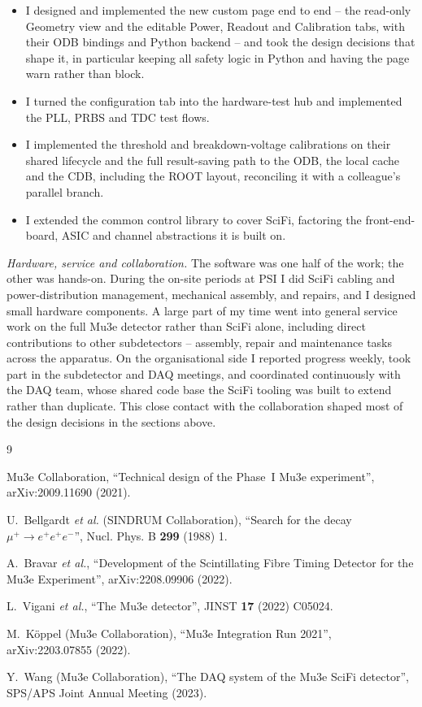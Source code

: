 \documentclass[12pt,a4paper]{article}
\newcommand{\pill}[1]{\textit{#1}\;}   %
\begin{document}
\begin{itemize}
	\item I designed and implemented the new custom page end to end -- the
	read-only Geometry view and the editable Power, Readout and Calibration tabs,
	with their ODB bindings and Python backend -- and took the design decisions
	that shape it, in particular keeping all safety logic in Python and having the
	page warn rather than block.
	\item I turned the configuration tab into the hardware-test hub and
	implemented the PLL, PRBS and TDC test flows.
	\item I implemented the threshold and breakdown-voltage calibrations on their
	shared lifecycle and the full result-saving path to the ODB, the local cache
	and the CDB, including the ROOT layout, reconciling it with a colleague's
	parallel branch.
	\item I extended the common control library to cover SciFi, factoring the
	front-end-board, ASIC and channel abstractions it is built on.
\end{itemize}

\pill{Hardware, service and collaboration.}
The software was one half of the work; the other was hands-on. During the on-site
periods at PSI I did SciFi cabling and power-distribution management, mechanical
assembly, and repairs, and I designed small hardware components. A large part of
my time went into general service work on the full Mu3e detector rather than
SciFi alone, including direct contributions to other subdetectors -- assembly,
repair and maintenance tasks across the apparatus. On the organisational side I
reported progress weekly, took part in the subdetector and DAQ meetings, and
coordinated continuously with the DAQ team, whose shared code base the SciFi
tooling was built to extend rather than duplicate. This close contact with the
collaboration shaped most of the design decisions in the sections above.

\begin{thebibliography}{9}

Mu3e Collaboration,
``Technical design of the Phase~I Mu3e experiment'',
arXiv:2009.11690 (2021).

U.~Bellgardt \textit{et al.} (SINDRUM Collaboration),
``Search for the decay $\mu^+ \to e^+e^+e^-$'',
Nucl. Phys. B \textbf{299} (1988) 1.

A.~Bravar \textit{et al.},
``Development of the Scintillating Fibre Timing Detector for the Mu3e
Experiment'',
arXiv:2208.09906 (2022).

L.~Vigani \textit{et al.},
``The Mu3e detector'',
JINST \textbf{17} (2022) C05024.

M.~K\"oppel (Mu3e Collaboration),
``Mu3e Integration Run 2021'',
arXiv:2203.07855 (2022).

Y.~Wang (Mu3e Collaboration),
``The DAQ system of the Mu3e SciFi detector'',
SPS/APS Joint Annual Meeting (2023).

\end{thebibliography}
\end{document}
